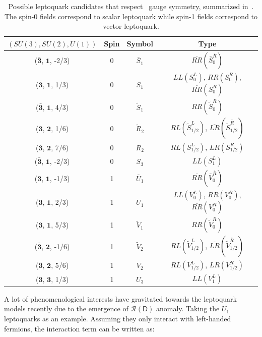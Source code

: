 \begin{table}[th]
\sffamily
\centering
\caption{Possible leptoquark candidates that respect \sm~gauge symmetry, summarized in~\cite{Dorsner:2016wpm}. The spin-0 fields correspond to scalar leptoquark while spin-1 fields correspond to vector leptoquark.}
\begin{tabular}{cccc}
\toprule 
$(SU(3), SU(2), U(1))$ & Spin   & Symbol & Type \\ \midrule
($\bar{\bm{3}}$, $\bm{1}$, -2/3) & 0 & $\bar{S}_{1}$ & $\overline{RR}(\bar{S}_{0}^{\bar{R}})$ \\
($\bar{\bm{3}}$, $\bm{1}$, 1/3) & 0 & $S_{1}$ & $LL(S_{0}^{L})$, $RR(S_{0}^{R})$, $\overline{RR}(S_{0}^{\bar{R}})$ \\
($\bar{\bm{3}}$, $\bm{1}$, 4/3) & 0 & $\tilde{S}_{1}$ & $RR(\tilde{S}_{0}^{R})$ \\
($\bm{\bm{3}}$, $\bm{2}$, 1/6) & 0 & $\tilde{R}_{2}$ & $RL(\tilde{S}_{1/2}^{L})$, $\overline{LR}(\tilde{S}_{1/2}^{\bar{R}})$ \\
($\bar{\bm{3}}$, $\bm{2}$, 7/6) & 0 & $R_{2}$ & $RL(S_{1/2}^{L})$, $LR(S_{1/2}^{R})$ \\
($\bar{\bm{3}}$, $\bm{1}$, -2/3) & 0 & $S_{3}$ & $LL(S_{1}^{L})$\\
\midrule
($\bm{3}$, $\bm{1}$, -1/3) & 1 & $\bar{U}_{1}$ & $\overline{RR}(\bar{V}_{0}^{\bar{R}})$ \\
($\bm{3}$, $\bm{1}$, 2/3) & 1 & $U_{1}$ & $LL(V_{0}^{L})$, $RR(V_{0}^{R})$, $\overline{RR}(V_{0}^{\bar{R}})$ \\
($\bm{3}$, $\bm{1}$, 5/3) & 1 & $\tilde{V}_{1}$ & $RR(\tilde{V}_{0}^{R})$ \\
($\bar{\bm{3}}$, $\bm{2}$, -1/6) & 1 & $\tilde{V}_{2}$ & $RL(\tilde{V}_{1/2}^{L})$, $\overline{LR}(\tilde{V}_{1/2}^{\bar{R}})$ \\
($\bar{\bm{3}}$, $\bm{2}$, 5/6) & 1 & $V_{2}$ & $RL(V_{1/2}^{L})$, $LR(V_{1/2}^{R})$ \\
($\bm{3}$, $\bm{3}$, 1/3) & 1 & $U_{3}$ & $LL(V_{1}^{L})$\\
\bottomrule
\end{tabular}
\vspace{-0.5em}
\label{tab:Leptoquark}
\end{table}

A lot of phenomenological interests have gravitated towards the leptoquark models recently due to the emergence of $\mathcal{R}(\textsf{D})$ anomaly. Taking the $U_{1}$ leptoquarks as an example. Assuming they only interact with left-handed fermions, the interaction term can be written as:

